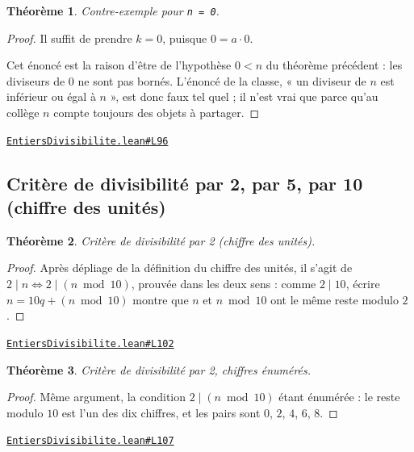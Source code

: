 \documentclass[11pt,a4paper]{article}
\theoremstyle{definition}
\theoremstyle{plain}
\newtheorem{theoreme}{Théorème}
\newcommand{\source}[2]{\par\smallskip\noindent\hfill{\footnotesize\href{#1}{\texttt{#2}}}\par\smallskip}
\begin{document}
\begin{theoreme}
Contre-exemple pour \texttt{n = 0}.
\end{theoreme}

\begin{proof}
Il suffit de prendre $k = 0$, puisque $0 = a \cdot 0$.

Cet énoncé est la raison d'être de l'hypothèse $0 < n$ du théorème précédent : les
diviseurs de $0$ ne sont pas bornés. L'énoncé de la classe, « un diviseur de $n$ est
inférieur ou égal à $n$ », est donc faux tel quel ; il n'est vrai que parce qu'au
collège $n$ compte toujours des objets à partager.
\end{proof}
\source{https://github.com/Commutator-IO/learn-lean/blob/main/courses/01-college/01-nombres-et-calculs/EntiersDivisibilite.lean\#L96}{EntiersDivisibilite.lean\#L96}

\subsection{Critère de divisibilité par 2, par 5, par 10 (chiffre des unités)}

\begin{theoreme}
Critère de divisibilité par 2 (chiffre des unités).
\end{theoreme}

\begin{proof}
Après dépliage de la définition du chiffre des unités, il s'agit de
$2 \mid n \iff 2 \mid (n \bmod 10)$, prouvée dans les deux sens : comme $2 \mid 10$, écrire $n = 10q + (n \bmod 10)$ montre que $n$ et
$n \bmod 10$ ont le même reste modulo $2$.
\end{proof}
\source{https://github.com/Commutator-IO/learn-lean/blob/main/courses/01-college/01-nombres-et-calculs/EntiersDivisibilite.lean\#L102}{EntiersDivisibilite.lean\#L102}

\begin{theoreme}
Critère de divisibilité par 2, chiffres énumérés.
\end{theoreme}

\begin{proof}
Même argument, la condition $2 \mid (n \bmod 10)$ étant énumérée : le reste modulo $10$
est l'un des dix chiffres, et les pairs sont $0$, $2$, $4$, $6$, $8$.
\end{proof}
\source{https://github.com/Commutator-IO/learn-lean/blob/main/courses/01-college/01-nombres-et-calculs/EntiersDivisibilite.lean\#L107}{EntiersDivisibilite.lean\#L107}
\end{document}
